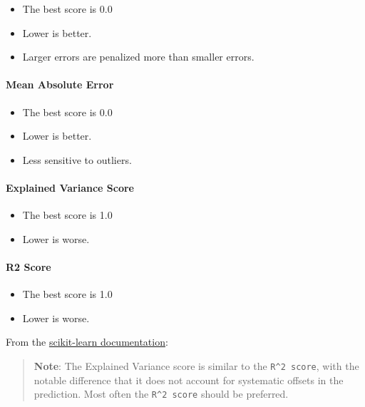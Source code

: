 \documentclass[11pt]{article}
\providecommand{\tightlist}{%
      \setlength{\itemsep}{0pt}\setlength{\parskip}{0pt}}
\begin{document}
\begin{itemize}
\tightlist
\item
  The best score is 0.0
\item
  Lower is better.
\item
  Larger errors are penalized more than smaller errors.
\end{itemize}

\paragraph{Mean Absolute Error}\label{mean-absolute-error}

\begin{itemize}
\tightlist
\item
  The best score is 0.0
\item
  Lower is better.
\item
  Less sensitive to outliers.
\end{itemize}

\paragraph{Explained Variance Score}\label{explained-variance-score}

\begin{itemize}
\tightlist
\item
  The best score is 1.0
\item
  Lower is worse.
\end{itemize}

\paragraph{R2 Score}\label{r2-score}

\begin{itemize}
\tightlist
\item
  The best score is 1.0
\item
  Lower is worse.
\end{itemize}

From the
\href{https://scikit-learn.org/stable/modules/generated/sklearn.metrics.explained_variance_score.html}{scikit-learn
documentation}:

\begin{quote}
\textbf{Note}: The Explained Variance score is similar to the
\texttt{R\^{}2\ score}, with the notable difference that it does not
account for systematic offsets in the prediction. Most often the
\texttt{R\^{}2\ score} should be preferred.
\end{quote}
\end{document}
